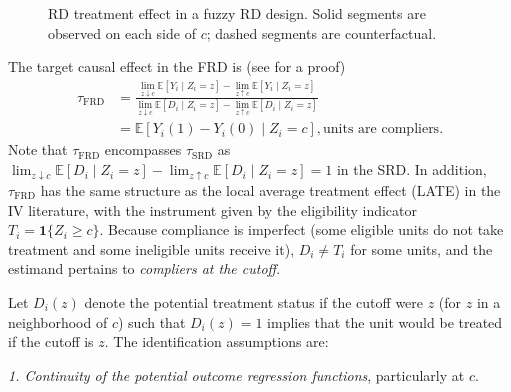 \begin{figure}[ht]
	\caption{RD treatment effect in a fuzzy RD design. Solid segments are observed on each side of $c$; dashed segments are counterfactual.}
	\label{fig:FRD-muplus-muminus}
\end{figure}

The target causal effect in the FRD is (see \cite{hahn2001rdd} for a proof)
\begin{align*}
\tau_{\text{FRD}}
&=
\frac{\lim_{z \downarrow c}\mathbb{E}[Y_i\mid Z_i=z]-\lim_{z \uparrow c}\mathbb{E}[Y_i\mid Z_i=z]}
{\lim_{z \downarrow c}\mathbb{E}[D_i\mid Z_i=z]-\lim_{z \uparrow c}\mathbb{E}[D_i\mid Z_i=z]}\\
&=\mathbb{E}[Y_i(1)-Y_i(0)\mid Z_i=c], \text{units are compliers}.
\end{align*}
Note that $\tau_{\text{FRD}}$ encompasses $\tau_{\text{SRD}}$ as $\lim_{z \downarrow c}\mathbb{E}[D_i\mid Z_i=z]-\lim_{z \uparrow c}\mathbb{E}[D_i\mid Z_i=z]=1$ in the SRD. In addition, $\tau_{\text{FRD}}$ has the same structure as the local average treatment effect (LATE) in the IV literature, with the instrument given by the eligibility indicator \(T_i=\mathbf{1}\{Z_i\ge c\}\). Because compliance is imperfect (some eligible units do not take treatment and some ineligible units receive it), \(D_i \neq T_i\) for some units, and the estimand pertains to \emph{compliers at the cutoff}.

Let \(D_i(z)\) denote the potential treatment status if the cutoff were \(z\) (for \(z\) in a neighborhood of \(c\)) such that $D_i(z)=1$ implies that the unit would be treated if the cutoff is $z$. The identification assumptions are: 

\textit{1. Continuity of the potential outcome regression functions}, particularly at \(c\).

